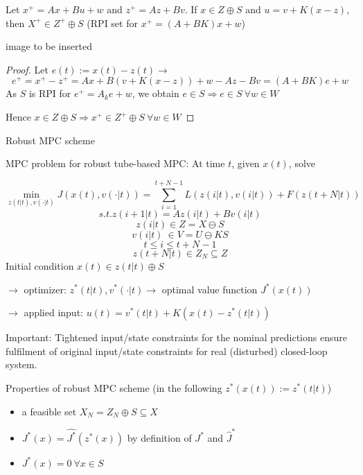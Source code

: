 Let $x^+ = Ax + Bu + w$ and $z^+ = Az + Bv$. If $ x \in Z \oplus S$ and $ u = v + K(x - z)$, then $ X^+ \in Z^+ \oplus S$ (RPI set for $x^+ = (A+BK)x + w$)

image to be inserted

\begin{proof}

Let $e(t) := x(t) - z(t) \rightarrow$
\begin{equation*}
e^+ = x^+ - z^+ = Ax + B(v + K(x-z)) + w - Az - Bv = (A+BK)e + w
\end{equation*}
As $S$ is RPI for $e^+ = A_ke + w$, we obtain $e \in S \Rightarrow e \in S \ \forall w \in W$

Hence $x \in Z \oplus S \Rightarrow x^+ \in Z^+ \oplus S \ \forall w \in W$

\end{proof}

Robust MPC scheme 

MPC problem for robust tube-based MPC: At time $t$, given $x(t)$, solve 

\begin{equation*}
\min_{z(t|t), v(\cdot|t)} J(x(t),v(\cdot|t)) = \sum_{i = 1}^{t+ N -1}L(z(i|t), v(i|t)) + F(z(t+N|t))
\end{equation*}
\begin{equation*}
s.t. z(i+1|t) = Az(i|t) + Bv(i|t)
\end{equation*}  
\begin{equation*}
z(i|t) \in Z = X \ominus S 
\end{equation*}
\begin{equation*}
v(i|t) \ \in V = U \ominus KS
\end{equation*}
\begin{equation*}
t \leq i \leq t + N -1
\end{equation*}
\begin{equation*}
z(t+N|t) \in Z_N \subseteq Z 
\end{equation*}
Initial condition $x(t) \in z(t|t) \oplus S$

$\rightarrow$ optimizer: $z^*(t|t), v^*(\cdot|t) \rightarrow$ optimal value function $J^*(x(t))$

$\rightarrow$ applied input: $u(t) = v^*(t|t) + K(x(t) - z^*(t|t))$

Important: Tightened input/state constraints for the nominal predictions ensure fulfilment of original input/state constraints for real (disturbed) closed-loop system.

Properties of robust MPC scheme (in the following $z^*(x(t)):=z^*(t|t)$)
\begin{itemize}
\item a feasible set $X_N = Z_N \oplus S \subseteq X$
\item $J^*(x) = \hat{J^*}(z^*(x))$ by definition of $J^*$ and $\hat J^*$
\item $J^*(x) = 0 \ \forall x \in S$
\end{itemize}    

